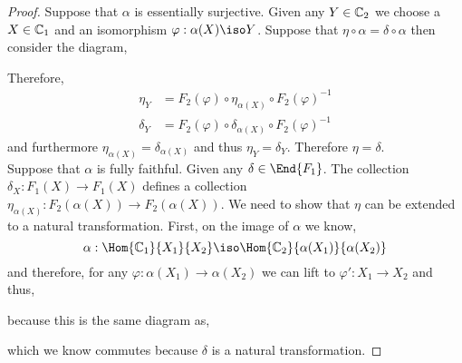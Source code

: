 \documentclass[12pt]{article}
\begin{document}
\begin{proof}
Suppose that $\alpha$ is essentially surjective. Given any $Y \in \mathbb{C}_2$ we choose a $X \in \mathbb{C}_1$ and an isomorphism $\varphi : \alpha(X) \iso Y$. Suppose that $\eta \circ \alpha = \delta \circ \alpha$ then consider the diagram,
\begin{center}
\end{center} 
Therefore,
\begin{align*}
\eta_Y & = F_2(\varphi) \circ \eta_{\alpha(X)} \circ F_2(\varphi)^{-1}
\\
\delta_Y & = F_2(\varphi) \circ \delta_{\alpha(X)} \circ F_2(\varphi)^{-1}
\end{align*} 
and furthermore $\eta_{\alpha(X)} = \delta_{\alpha(X)}$ and thus $\eta_Y = \delta_Y$. Therefore $\eta = \delta$.
\bigskip\\
Suppose that $\alpha$ is fully faithful. Given any $\delta \in \End{F_1}$. The collection $\delta_X : F_1(X) \to F_1(X)$ defines a collection $\eta_{\alpha(X)} : F_2(\alpha(X)) \to F_2(\alpha(X))$. We need to show that $\eta$ can be extended to a natural transformation. First, on the image of $\alpha$ we know,
\[ \alpha : \Hom{\C_1}{X_1}{X_2} \iso \Hom{\C_2}{\alpha(X_1)}{\alpha(X_2)} \]
and therefore, for any $\varphi : \alpha(X_1) \to \alpha(X_2)$ we can lift to $\varphi' : X_1 \to X_2$ and thus,
\begin{center}
\end{center} 
because this is the same diagram as,
\begin{center}
\end{center}
which we know commutes because $\delta$ is a natural transformation. 
\end{proof}
\end{document}
